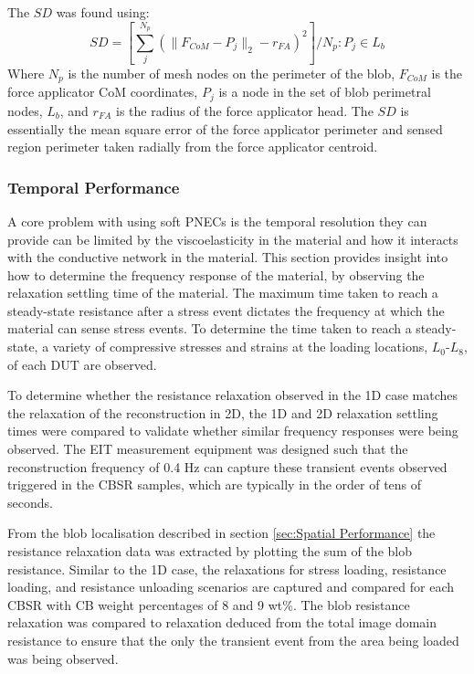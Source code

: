 The $S\!D$ was found using:
\begin{equation}
    S\!D = \left[\sum_j^{N_p} \left(\|F_{CoM} - P_j\|_2 - r_{FA}\right)^2\right] \bigg/ N_p : P_j \in L_{b}
    \label{eqn:shape_deform}
\end{equation}
Where $N_p$ is the number of mesh nodes on the perimeter of the blob, $F_{CoM}$ is the force applicator CoM coordinates, $P_j$ is a node in the set of blob perimetral nodes, $L_{b}$, and $r_{FA}$ is the radius of the force applicator head. The $S\!D$ is essentially the mean square error of the force applicator perimeter and sensed region perimeter taken radially from the force applicator centroid.


\subsubsection{Temporal Performance}\label{sec:Temporal Performance}
A core problem with using soft PNECs is the temporal resolution they can provide can be limited by the viscoelasticity in the material and how it interacts with the conductive network in the material. This section provides insight into how to determine the frequency response of the material, by observing the relaxation settling time of the material. The maximum time taken to reach a steady-state resistance after a stress event dictates the frequency at which the material can sense stress events. To determine the time taken to reach a steady-state, a variety of compressive stresses and strains at the loading locations, $L_0$-$L_8$, of each DUT are observed. 


To determine whether the resistance relaxation observed in the 1D case matches the relaxation of the reconstruction in 2D, the 1D and 2D relaxation settling times were compared to validate whether similar frequency responses were being observed. The EIT measurement equipment was designed such that the reconstruction frequency of 0.4 Hz can capture these transient events observed triggered in the CBSR samples, which are typically in the order of tens of seconds. 


From the blob localisation described in section \ref{sec:Spatial Performance} the resistance relaxation data was extracted by plotting the sum of the blob resistance. Similar to the 1D case, the relaxations for stress loading, resistance loading, and resistance unloading scenarios are captured and compared for each CBSR with CB weight percentages of 8 and 9 wt\%. The blob resistance relaxation was compared to relaxation deduced from the total image domain resistance to ensure that the only the transient event from the area being loaded was being observed.

